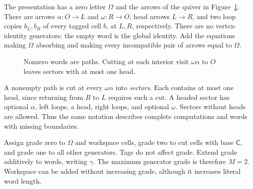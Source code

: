 The presentation has a zero letter $\Omega$ and the arrows of the quiver
in Figure~\ref{fig:compiler-quiver}. There are arrows
$\alpha:O\to L$ and $\omega:R\to O$, head arrows $L\to R$, and two
loop copies $b_L,b_R$ of every tagged cell $b$, at $L,R$, respectively.
There are no vertex-identity generators: the empty word is the global
identity. Add the equations making $\Omega$ absorbing and making every
incompatible pair of arrows equal to $\Omega$.

\begin{figure}[ht]
\centering
{}
\caption{Nonzero words are paths. Cutting at each interior visit
$\omega\alpha$ to $O$ leaves sectors with at most one head.}
\label{fig:compiler-quiver}
\end{figure}

A nonempty path is cut at every $\omega\alpha$ into \emph{sectors}.
Each contains at most one head, since returning from $R$ to $L$
requires such a cut. A headed sector has optional $\alpha$, left loops,
a head, right loops, and optional $\omega$. Sectors without heads
are allowed. Thus the same notation describes complete computations
and words with missing boundaries.

Assign grade zero to $\Omega$ and workspace cells, grade two to cut cells
with base $\mathsf C$, and grade one to all other generators. Tags do
not affect grade. Extend grade additively to words, writing $\gamma$.
The maximum generator grade is therefore $M=2$. Workspace can be added
without increasing grade, although it increases literal word length.

